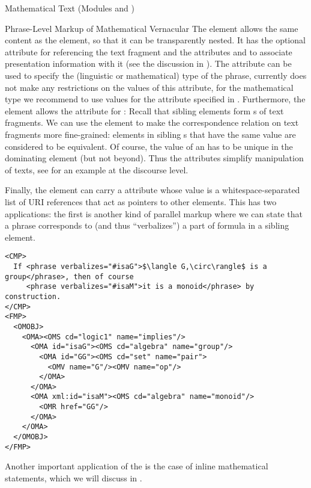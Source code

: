 \begin{tchapter}[id=mtxt,short=Mathematical Text]{Mathematical Text (Modules
  {} and {})}
\begin{tsection}[id=phrases]{Phrase-Level Markup of Mathematical Vernacular}
  The {} element allows the same content as the {} element, so
  that it can be transparently nested. It has the optional attribute
  {} for referencing the text fragment and the {\css}
  attributes {} and {} to associate
  presentation information with it (see the discussion in
  {}). The {} attribute can be
  used to specify the (linguistic or mathematical) type of the phrase, currently {\omdoc}
  does not make any restrictions on the values of this attribute, for the mathematical
  type we recommend to use values for the {} attribute specified
  in {}. Furthermore, the {} element allows the attribute
  {} for {}: Recall
  that sibling {} elements form {s} of text
  fragments.  We can use the {} element to make the correspondence
  relation on text fragments more fine-grained: {} elements in sibling
  {s} that have the same {} value are considered to
  be equivalent.  Of course, the value of an {} has to be unique
  in the dominating {} element (but not beyond). Thus the
  {} attributes simplify manipulation of
  {} texts, see {} for an example at
  the discourse level.

  Finally, the {} element can carry a {}
  attribute whose value is a whitespace-separated list of URI references that act as
  pointers to other {\omdoc} elements. This has two applications: the first is another
  kind of parallel markup where we can state that a phrase corresponds to (and thus
  ``verbalizes'') a part of formula in a sibling {} element.

\begin{lstlisting}[label=lst:parallel-formal-informal,mathescape,
  caption=Parallel Markup between Formal and Informal,
  index={phrase,CMP,FMP}]
<CMP>
  If <phrase verbalizes="#isaG">$\langle G,\circ\rangle$ is a group</phrase>, then of course
     <phrase verbalizes="#isaM">it is a monoid</phrase> by construction.
</CMP>
<FMP>
  <OMOBJ>
    <OMA><OMS cd="logic1" name="implies"/>
      <OMA id="isaG"><OMS cd="algebra" name="group"/>
        <OMA id="GG"><OMS cd="set" name="pair">
          <OMV name="G"/><OMV name="op"/>
        </OMA>
      </OMA>
      <OMA xml:id="isaM"><OMS cd="algebra" name="monoid"/>
        <OMR href="GG"/>
      </OMA>
    </OMA>
  </OMOBJ>
</FMP>
\end{lstlisting}
Another important application of the {} is the case of
inline mathematical statements, which we will discuss in {}.
\end{tsection}


\end{tchapter}

